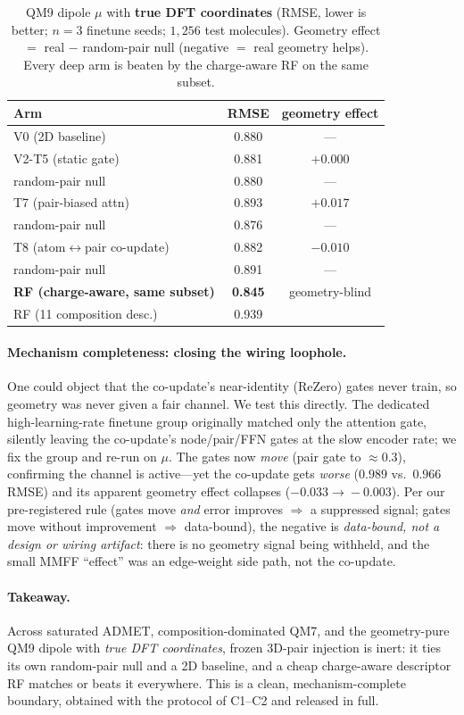 \begin{table}[t]
\centering
\caption{QM9 dipole $\mu$ with \textbf{true DFT coordinates}
(RMSE, lower is better; $n{=}3$ finetune seeds; $1{,}256$ test molecules).
Geometry effect $=$ real $-$ random-pair null (negative $=$ real geometry
helps). Every deep arm is beaten by the charge-aware RF on the same subset.}
\label{tab:dft}
\begin{tabular}{lcc}
\toprule
Arm & RMSE & geometry effect \\
\midrule
V0 (2D baseline)              & 0.880 & --- \\
V2-T5 (static gate)           & 0.881 & $+0.000$ \\
\quad random-pair null        & 0.880 & --- \\
T7 (pair-biased attn)         & 0.893 & $+0.017$ \\
\quad random-pair null        & 0.876 & --- \\
T8 (atom$\leftrightarrow$pair co-update) & 0.882 & $-0.010$ \\
\quad random-pair null        & 0.891 & --- \\
\midrule
\textbf{RF (charge-aware, same subset)} & \textbf{0.845} & geometry-blind \\
RF (11 composition desc.)               & 0.939 & \\
\bottomrule
\end{tabular}
\end{table}

\paragraph{Mechanism completeness: closing the wiring loophole.}
One could object that the co-update's near-identity (ReZero) gates never train,
so geometry was never given a fair channel. We test this directly. The dedicated
high-learning-rate finetune group originally matched only the attention gate,
silently leaving the co-update's node/pair/FFN gates at the slow encoder rate; we
fix the group and re-run on $\mu$. The gates now \emph{move} (pair gate to
${\approx}0.3$), confirming the channel is active---yet the co-update gets
\emph{worse} ($0.989$ vs.\ $0.966$ RMSE) and its apparent geometry effect
collapses ($-0.033\!\rightarrow\!-0.003$). Per our pre-registered rule (gates
move \emph{and} error improves $\Rightarrow$ a suppressed signal; gates move
without improvement $\Rightarrow$ data-bound), the negative is \emph{data-bound,
not a design or wiring artifact}: there is no geometry signal being withheld,
and the small MMFF ``effect'' was an edge-weight side path, not the co-update.

\paragraph{Takeaway.}
Across saturated ADMET, composition-dominated QM7, and the geometry-pure QM9
dipole with \emph{true DFT coordinates}, frozen 3D-pair injection is inert: it
ties its own random-pair null and a 2D baseline, and a cheap charge-aware
descriptor RF matches or beats it everywhere. This is a clean, mechanism-complete
boundary, obtained with the protocol of C1--C2 and released in full.
